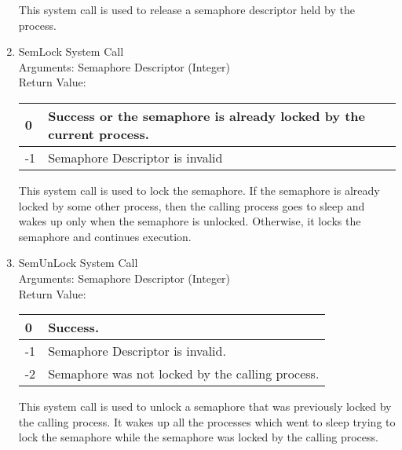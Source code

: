 \begin{enumerate}
This system call is used to release a semaphore descriptor held by the process.  


\item{SemLock System Call}
\\
Arguments: Semaphore Descriptor (Integer)\\
Return Value:
\FloatBarrier \begin{table}[H]
\centering
\begin{tabular}{|l|l|}
\hline
0	& Success or the semaphore is already locked by the current process. \\ \hline
-1	& Semaphore Descriptor is invalid \\ \hline
\end{tabular}
\end{table} \FloatBarrier 

This system call is used to lock the semaphore. If the semaphore is already locked by some other process, then the calling process goes to sleep and wakes up only when the semaphore is unlocked. Otherwise, it locks the semaphore and continues execution. 

\item{SemUnLock System Call}
\\
Arguments: Semaphore Descriptor (Integer)\\
Return Value:
\FloatBarrier \begin{table}[H]
\centering
\begin{tabular}{|l|l|}
\hline
0	& Success. \\ \hline
-1	& Semaphore Descriptor is invalid. \\ \hline
-2 	& Semaphore was not locked by the calling process. \\ \hline
\end{tabular}
\end{table} \FloatBarrier 

This system call is used to unlock a semaphore that was previously locked by the calling process. It wakes up all the processes which went to sleep trying to lock the semaphore while the semaphore was locked by the calling process. 
\end{enumerate}
